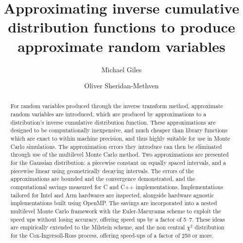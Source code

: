 \documentclass[manuscript,review]{acmart}
\title{Approximating inverse cumulative distribution functions to produce approximate random variables}
\author{Michael Giles}
\author{Oliver Sheridan-Methven}
\affiliation{%
\institution{Mathematical Institute, Oxford University}
\city{Oxford}
\country{UK}}
\begin{document}
\begin{abstract}
For random variables produced through the inverse transform method, approximate random variables are introduced, which are produced by approximations to a distribution's inverse cumulative distribution function. These approximations are designed to be computationally inexpensive, and much cheaper than library functions which are exact to within machine precision, and thus highly suitable for use in Monte Carlo simulations. The approximation errors they introduce can then be eliminated through use of the multilevel Monte Carlo method.  Two approximations are presented for the Gaussian distribution: a piecewise constant on equally spaced intervals, and a piecewise linear using geometrically decaying intervals. The errors of the approximations are bounded and the convergence demonstrated, and the computational savings measured for C and C++ implementations. Implementations tailored for Intel and Arm hardwares are inspected, alongside hardware agnostic implementations built using OpenMP. The savings are incorporated into a nested multilevel Monte Carlo framework with the Euler-Maruyama scheme to exploit the speed ups without losing accuracy, offering speed ups by a factor of 5--7. These ideas are empirically extended to the Milstein scheme, and the non central $ \chi^2 $ distribution for the Cox-Ingersoll-Ross process, offering speed-ups of a factor of 250 or more.  
\end{abstract}
\end{document}
